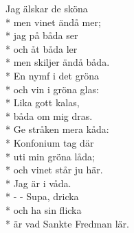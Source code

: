 \begin{SongText}
\begin{SongVerse}
\end{SongVerse}
\begin{SongVerse}
Jag älskar de sköna\\*%
men vinet ändå mer;\\*%
jag på båda ser\\*%
och åt båda ler\\*%
men skiljer ändå båda.\\*%
En nymf i det gröna\\*%
och vin i gröna glas:\\*%
Lika gott kalas,\\*%
båda om mig dras.\\*%
Ge stråken mera kåda:\\*%
Konfonium tag där\\*%
uti min gröna låda;\\*%
och vinet står ju här.\\*%
Jag är i våda.\\*%
- - Supa, dricka\\*%
och ha sin flicka\\*%
är vad Sankte Fredman lär. 
\end{SongVerse}
\end{SongText}

